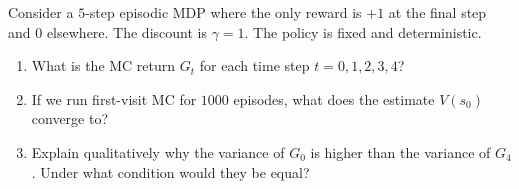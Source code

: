 \begin{exercise}
\label{ex:mc-td-comparison}
Consider a $5$-step episodic MDP where the only reward is $+1$ at the final step and $0$ elsewhere.  The discount is $\gamma = 1$.  The policy is fixed and deterministic.
\begin{enumerate}[label=(\alph*)]
  \item What is the MC return $G_t$ for each time step $t = 0, 1, 2, 3, 4$?
  \item If we run first-visit MC for $1000$ episodes, what does the estimate $V(s_0)$ converge to?
  \item Explain qualitatively why the variance of $G_0$ is higher than the variance of $G_4$.  Under what condition would they be equal?
\end{enumerate}
\end{exercise}
